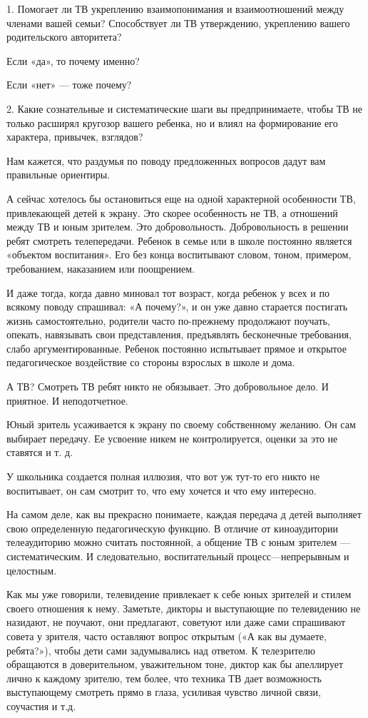 \documentclass[12pt, a4paper, openany]{book}
\begin{document}
1. Помогает ли ТВ укреплению взаимопонимания и взаимоотношений между членами вашей семьи? Способствует ли ТВ утверждению, укреплению вашего родительского авторитета? 

Если «да», то почему именно? 

Если «нет» — тоже почему? 

2. Какие сознательные и систематические шаги вы предпринимаете, чтобы ТВ не только расширял кругозор вашего ребенка, но и влиял на формирование его характера, привычек, взглядов? 

Нам кажется, что раздумья по поводу предложенных вопросов дадут вам правильные ориентиры. 

А сейчас хотелось бы остановиться еще на одной характерной особенности ТВ, привлекающей детей к экрану. Это скорее особенность не ТВ, а отношений между ТВ и юным зрителем. Это добровольность. Добровольность в решении ребят смотреть телепередачи. Ребенок в семье или в школе постоянно является «объектом воспитания». Его без конца воспитывают словом, тоном, примером, требованием, наказанием или поощрением. 

И даже тогда, когда давно миновал тот возраст, когда ребенок у всех и по всякому поводу спрашивал: «А почему?», и он уже давно старается постигать жизнь самостоятельно, родители часто по-прежнему продолжают поучать, опекать, навязывать свои представления, предъявлять бесконечные требования, слабо аргументированные. Ребенок постоянно испытывает прямое и открытое педагогическое воздействие со стороны взрослых в школе и дома. 

А ТВ? Смотреть ТВ ребят никто не обязывает. Это добровольное дело. И приятное. И неподотчетное. 

Юный зритель усаживается к экрану по своему собственному желанию. Он сам выбирает передачу. Ее усвоение никем не контролируется, оценки за это не ставятся и т. д. 

У школьника создается полная иллюзия, что вот уж тут-то его никто не воспитывает, он сам смотрит то, что ему хочется и что ему интересно. 

На самом деле, как вы прекрасно понимаете, каждая передача д детей выполняет свою определенную педагогическую функцию. В отличие от киноаудитории телеаудиторию можно считать постоянной, а общение ТВ с юным зрителем — систематическим. И следовательно, воспитательный процесс—непрерывным и целостным. 

Как мы уже говорили, телевидение привлекает к себе юных зрителей и стилем своего отношения к нему. Заметьте, дикторы и выступающие по телевидению не назидают, не поучают, они предлагают, советуют или даже сами спрашивают совета у зрителя, часто оставляют вопрос открытым («А как вы думаете, ребята?»), чтобы дети сами задумывались над ответом. К телезрителю обращаются в доверительном, уважительном тоне, диктор как бы апеллирует лично к каждому зрителю, тем более, что техника ТВ дает возможность выступающему смотреть прямо в глаза, усиливая чувство личной связи, соучастия и т.д. 
\end{document}
